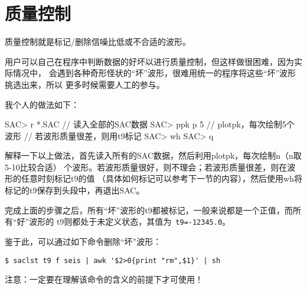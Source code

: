 \section{质量控制}

质量控制就是标记/删除信噪比低或不合适的波形。

用户可以自己在程序中判断数据的好坏以进行质量控制，但这样做很困难，因为实际情况中，
会遇到各种奇形怪状的``坏''波形，很难用统一的程序将这些``坏''波形挑选出来，所以
更多时候需要人工的参与。


我个人的做法如下：
\begin{SACCode}
SAC> r *.SAC        // 读入全部的SAC数据
SAC> ppk p 5        // plotpk，每次绘制5个波形
// 若波形质量很差，则用t9标记
SAC> wh
SAC> q
\end{SACCode}

解释一下以上做法，首先读入所有的SAC数据，然后利用plotpk，每次绘制n（n取5-10比较合适）
个波形。若波形质量很好，则不理会；若波形质量很差，则在波形的任意时刻标记t9的值
（具体如何标记可以参考下一节的内容），然后使用wh将标记的t9保存到头段中，再退出SAC。

完成上面的步骤之后，所有``坏''波形的t9都被标记，一般来说都是一个正值，而所有``好''波形的
t9则都处于未定义状态，其值为~\lstinline{t9=-12345.0}。

鉴于此，可以通过如下命令删除``坏''波形：
\begin{lstlisting}[style=Shell]
$ saclst t9 f seis | awk '$2>0{print "rm",$1}' | sh
\end{lstlisting}

注意：一定要在理解该命令的含义的前提下才可使用！
